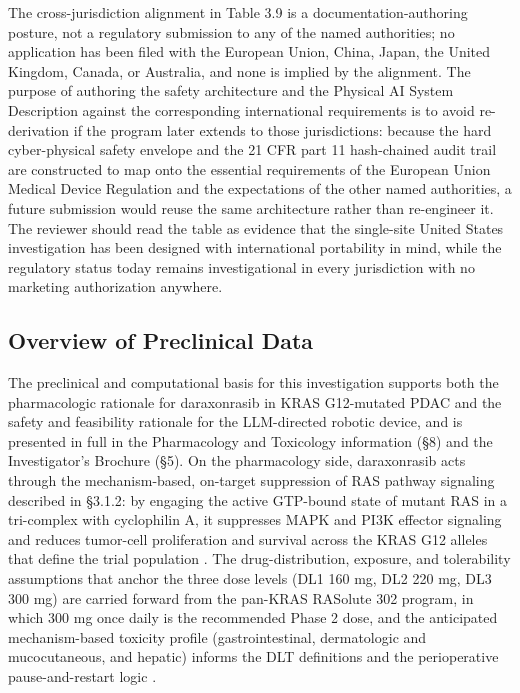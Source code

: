 The cross-jurisdiction alignment in Table 3.9 is a documentation-authoring posture,
not a regulatory submission to any of the named authorities; no application has been
filed with the European Union, China, Japan, the United Kingdom, Canada, or
Australia, and none is implied by the alignment. The purpose of authoring the safety
architecture and the Physical AI System Description against the corresponding
international requirements is to avoid re-derivation if the program later extends to
those jurisdictions: because the hard cyber-physical safety envelope and the 21 CFR
part 11 hash-chained audit trail are constructed to map onto the essential
requirements of the European Union Medical Device Regulation and the expectations of
the other named authorities, a future submission would reuse the same architecture
rather than re-engineer it. The reviewer should read the table as evidence that the
single-site United States investigation has been designed with international
portability in mind, while the regulatory status today remains investigational in
every jurisdiction with no marketing authorization anywhere.

\subsection{Overview of Preclinical Data}

The preclinical and computational basis for this investigation supports both the
pharmacologic rationale for daraxonrasib in KRAS G12-mutated PDAC and the safety and
feasibility rationale for the LLM-directed robotic device, and is presented in full
in the Pharmacology and Toxicology information (\S 8) and the Investigator's
Brochure (\S 5). On the pharmacology side, daraxonrasib acts through the
mechanism-based, on-target suppression of RAS pathway signaling described in
\S 3.1.2: by engaging the active GTP-bound state of mutant RAS in a tri-complex with
cyclophilin A, it suppresses MAPK and PI3K effector signaling and reduces tumor-cell
proliferation and survival across the KRAS G12 alleles that define the trial
population \cite{daraxwhipple}. The drug-distribution, exposure, and tolerability
assumptions that anchor the three dose levels (DL1 160 mg, DL2 220 mg, DL3 300 mg)
are carried forward from the pan-KRAS RASolute 302 program, in which 300 mg once
daily is the recommended Phase 2 dose, and the anticipated mechanism-based toxicity
profile (gastrointestinal, dermatologic and mucocutaneous, and hepatic) informs the
DLT definitions and the perioperative pause-and-restart logic \cite{onpremwhippl}.


